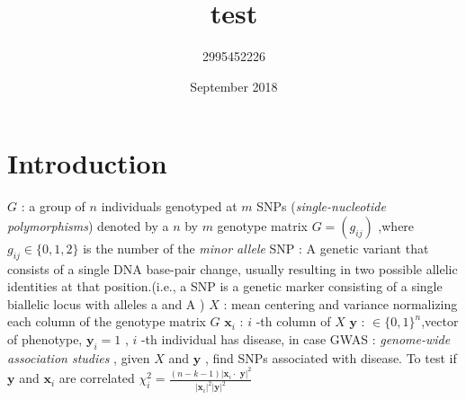 \documentclass{article}
\title{test}
\author{2995452226 }
\date{September 2018}
\begin{document}
\maketitle

\section{Introduction}
 \(G\) : a group of \(n\) individuals genotyped at \(m\) SNPs (\textit{single-nucleotide polymorphisms}) denoted by a \(n\) by \(m\) genotype matrix \(G=(g_{ij})\) ,where \(g_{ij}\in \{0,1,2\}\) is the number of the \textit{minor allele}   
 SNP : A genetic variant that consists of a single DNA base-pair change, usually resulting in two possible allelic identities at that position.(i.e., a SNP is a genetic marker consisting of a single biallelic locus with alleles a and A )
 \(X\) : mean centering and variance normalizing each column of the genotype matrix \(G\)
 \(\textbf{x}_i\) : \(i\) -th column of \(X\)
 \(\textbf{y}\) : \(\in \{0,1\}^n\),vector of phenotype, \(\textbf{y}_i =1\) , \(i\) -th individual has disease, in case
 GWAS : \textit{genome-wide association studies} , given \(X\) and \(\textbf{y}\) , find SNPs associated with disease. To test if  \(\textbf{y}\) and  \(\textbf{x}_i\) are correlated
\(\chi^2_i=\frac{(n-k-1)|\textbf{x}_i\cdot\textbf{ y}|^2}{|\textbf{x}_i|^2|\textbf{y}|^2}\) 
\end{document}
